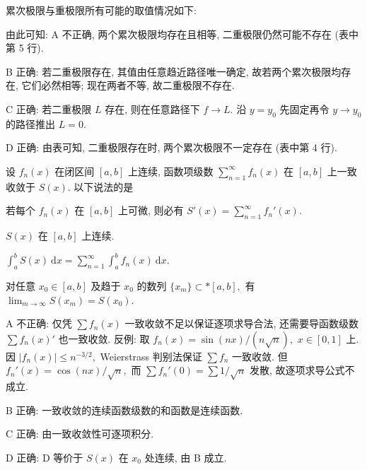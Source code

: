 \begin{solution}
累次极限与重极限所有可能的取值情况如下:

\begin{table}[H]
\centering

\end{table}

由此可知: A 不正确, 两个累次极限均存在且相等, 二重极限仍然可能不存在 (表中第 5 行).

B 正确: 若二重极限存在, 其值由任意趋近路径唯一确定, 故若两个累次极限均存在, 它们必然相等; 现在两者不等, 故二重极限不存在.

C 正确: 若二重极限 $L$ 存在, 则在任意路径下 $f \to L.$ 沿 $y = y_0$ 先固定再令 $y \to y_0$ 的路径推出 $L = 0.$

D 正确: 由表可知, 二重极限存在时, 两个累次极限不一定存在 (表中第 4 行).
\end{solution}

\begin{question}
设 $f_n(x)$ 在闭区间 $[a, b]$ 上连续, 函数项级数 $\sum_{n=1}^\infty f_n(x)$ 在 $[a, b]$ 上一致收敛于 $S(x).$ 以下说法的是 \paren[A]

\begin{choices}
\item 若每个 $f_n(x)$ 在 $[a, b]$ 上可微, 则必有 $\displaystyle S'(x) = \sum_{n=1}^\infty f_n'(x).$
\item $S(x)$ 在 $[a, b]$ 上连续.
\item $\displaystyle\int_a^b S(x) ~ \mathrm{d}x = \sum_{n=1}^\infty \int_a^b f_n(x) ~ \mathrm{d}x.$
\item 对任意 $x_0 \in [a, b]$ 及趋于 $x_0$ 的数列 $\{x_m\} \subset* [a, b],$ 有 $\displaystyle\lim_{m \to \infty} S(x_m) = S(x_0).$
\end{choices}
\end{question}

\begin{solution}
A 不正确: 仅凭 $\sum f_n(x)$ 一致收敛不足以保证逐项求导合法, 还需要导函数级数 $\sum f_n(x)'$ 也一致收敛. 反例: 取 $f_n(x) = \sin(nx) / (n\sqrt{n}),$ $x \in [0, 1]$ 上. 因 $|f_n(x)| \leqslant n^{-3/2},$ Weierstrass 判别法保证 $\sum f_n$ 一致收敛. 但 $f_n'(x) = \cos(nx) / \sqrt{n},$ 而 $\sum f_n'(0) = \sum 1/\sqrt{n}$ 发散, 故逐项求导公式不成立.

B 正确: 一致收敛的连续函数级数的和函数是连续函数.

C 正确: 由一致收敛性可逐项积分.

D 正确: D 等价于 $S(x)$ 在 $x_0$ 处连续, 由 B 成立.
\end{solution}


